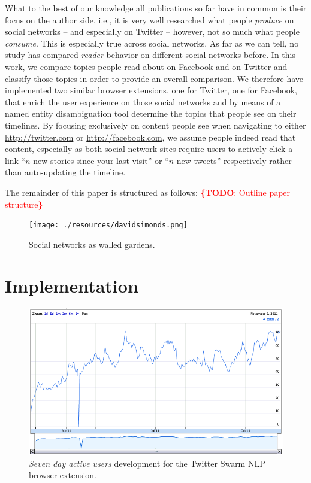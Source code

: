 \documentclass{iosart2c}
\newcommand{\todo}[1]{\noindent\textcolor{red}{{\bf \{TODO}: #1{\bf \}}}}
\begin{document}
What to the best of our knowledge all publications so far have in common is their focus on the author side, i.e., it is very well researched what people \emph{produce} on social networks -- and especially on Twitter -- however, not so much what people \emph{consume}.
This is especially true across social networks.
As far as we can tell, no study has compared \emph{reader} behavior on different social networks before.
In this work, we compare topics people read about on Facebook and on Twitter and classify those topics in order to provide an overall comparison.
We therefore have implemented two similar browser extensions, one for Twitter, one for Facebook, that enrich the user experience on those social networks and by means of a named entity disambiguation tool determine the topics that people see on their timelines.
By focusing exclusively on content people see when navigating to either \url{http://twitter.com} or \url{http://facebook.com}, we assume people indeed read that content, especially as both social network sites require users to actively click a link ``$\mathit{n}$ new stories since your last visit'' or ``$\mathit{n}$ new tweets'' respectively rather than auto-updating the timeline.

The remainder of this paper is structured as follows: \todo{Outline paper structure}

\begin{figure}
\centering
\texttt{[image: ./resources/davidsimonds.png]}
\caption{Social networks as walled gardens.~\cite{DavidSimonds}}
\label{fig:DavidSimonds}
\end{figure}

\section{Implementation} \label{sec:implementation}

\begin{figure}
\centering
\includegraphics[width=1.0\linewidth]{./resources/twitterswarmnlpstats.png}
\caption{\textit{Seven day active users} development for the Twitter Swarm NLP browser extension.}
\label{fig:twitterswarmnlpstats}
\end{figure}
\end{document}
